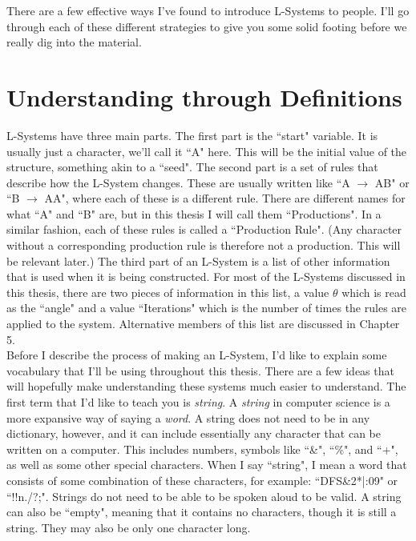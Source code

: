 \documentclass[12pt,twoside]{reedthesis}
\begin{document}
	There are a few effective ways I've found to introduce L-Systems to people. I'll go through each of these different strategies to give you some solid footing before we really dig into the material.\\


\section{Understanding through Definitions}

	L-Systems have three main parts. The first part is the ``start" variable. It is usually just a character, we'll call it ``A" here. This will be the initial value of the structure, something akin to a ``seed". The second part is a set of rules that describe how the L-System changes. These are usually written like ``A $\rightarrow$ AB" or ``B $\rightarrow$ AA", where each of these is a different rule. There are different names for what ``A" and ``B" are, but in this thesis I will call them ``Productions". In a similar fashion, each of these rules is called a ``Production Rule". (Any character without a corresponding production rule is therefore not a production. This will be relevant later.) The third part of an L-System is a list of other information that is used when it is being constructed. For most of the L-Systems discussed in this thesis, there are two pieces of information in this list, a value $\theta$ which is read as the ``angle" and a value ``Iterations" which is the number of times the rules are applied to the system. Alternative members of this list are discussed in Chapter 5.\\

	Before I describe the process of making an L-System, I'd like to explain some vocabulary that I'll be using throughout this thesis. There are a few ideas that will hopefully make understanding these systems much easier to understand. The first term that I'd like to teach you is \textit{string}. A \textit{string} in computer science is a more expansive way of saying a \textit{word}. A string does not need to be in any dictionary, however, and it can include essentially any character that can be written on a computer. This includes numbers, symbols like ``\&", ``\%", and ``+", as well as some other special characters. When I say ``string", I mean a word that consists of some combination of these characters, for example: ``DFS\&2*|:09" or ``!!n./?;". Strings do not need to be able to be spoken aloud to be valid. A string can also be ``empty", meaning that it contains no characters, though it is still a string. They may also be only one character long. \\
	
\end{document}
